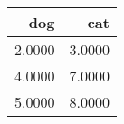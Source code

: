\begin{tabular}{rr}
\hline
    dog &    cat \\
\hline
 2.0000 & 3.0000 \\
 4.0000 & 7.0000 \\
 5.0000 & 8.0000 \\
\hline
\end{tabular}